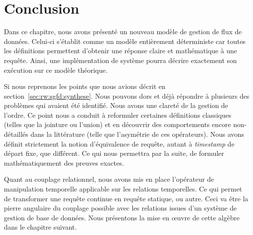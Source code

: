 \section{Conclusion}\label{sec:contrib:astral:conclusion}
Dans ce chapitre, nous avons présenté un nouveau modèle de gestion de flux de données. Celui-ci s'établit comme un modèle entièrement déterministe car toutes les définitions permettent d'obtenir une réponse claire et mathématique à une requête. Ainsi, une implémentation de système pourra décrire exactement son exécution sur ce modèle théorique.

Si nous reprenons les points que nous avions décrit en section~\ref{sec:rw:sgfd:synthese}. Nous pouvons dors et déjà répondre à plusieurs des problèmes qui avaient été identifié. Nous avons une clareté de la gestion de l'ordre. Ce point nous a conduit à reformuler certaines définitions classiques (telles que la jointure ou l'union) et en découvrir des comportements encore non-détaillés dans la littérature (telle que l'asymétrie de ces opérateurs). Nous avons définit strictement la notion d'équivalence de requête, autant à \textit{timestamp} de départ fixe, que différent. Ce qui nous permettra par la suite, de formuler mathématiquement des preuves exactes.

Quant au couplage relationnel, nous avons mis en place l'opérateur de manipulation temporelle applicable sur les relations temporelles. Ce qui permet de transformer une requête continue en requête statique, ou autre. Ceci va être la pierre angulaire du couplage possible avec les relations issues d'un système de gestion de base de données. Nous présentons la mise en œuvre de cette algèbre dans le chapitre suivant.
